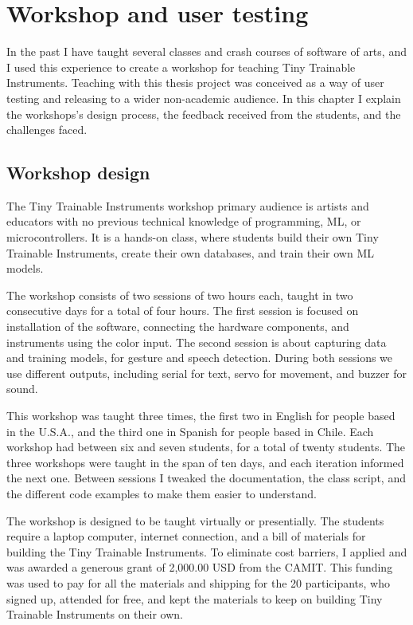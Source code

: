 \chapter{Workshop and user testing}

In the past I have taught several classes and crash courses of software of arts, and I used this experience to create a workshop for teaching Tiny Trainable Instruments. Teaching with this thesis project was conceived as a way of user testing and releasing to a wider non-academic audience. In this chapter I explain the workshops's design process, the feedback received from the students, and the challenges faced.

\section{Workshop design}

The Tiny Trainable Instruments workshop primary audience is artists and educators with no previous technical knowledge of programming, \acrshort{ML}, or microcontrollers. It is a hands-on class, where students build their own Tiny Trainable Instruments, create their own databases, and train their own \acrshort{ML} models.

The workshop consists of two sessions of two hours each, taught in two consecutive days for a total of four hours. The first session is focused on installation of the software, connecting the hardware components, and instruments using the color input. The second session is about capturing data and training models, for gesture and speech detection. During both sessions we use different outputs, including serial for text, servo for movement, and buzzer for sound.

This workshop was taught three times, the first two in English for people based in the U.S.A., and the third one in Spanish for people based in Chile. Each workshop had between six and seven students, for a total of twenty students. The three workshops were taught in the span of ten days, and each iteration informed the next one. Between sessions I tweaked the documentation, the class script, and the different code examples to make them easier to understand.

The workshop is designed to be taught virtually or presentially. The students require a laptop computer, internet connection, and a bill of materials for building the Tiny Trainable Instruments. To eliminate cost barriers, I applied and was awarded a generous grant of 2,000.00 USD from the \acrlong{CAMIT}. This funding was used to pay for all the materials and shipping for the 20 participants, who signed up, attended for free, and kept the materials to keep on building Tiny Trainable Instruments on their own.

